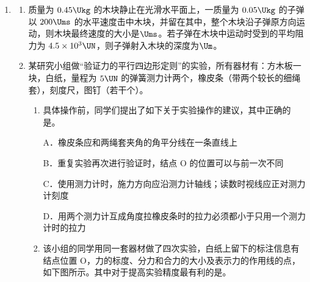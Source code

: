 \documentclass[\gkver]{gaokaozhenti}
\begin{document}
\begin{enumerate}
{若振幅为 $0.1\Um$，振子的周期可能为 $\frac{4}{5}\Us$}
{若振幅为 $0.2\Um$，振子的周期可能为 $4\Us$}
{若振幅为 $0.2\Um$，振子的周期可能为 $6\Us$}


\item
\begin{enumerate}
	\item
	质量为 $0.45\Ukg$ 的木块静止在光滑水平面上，一质量为 $0.05\Ukg$ 的子弹以 $200\Ums$ 的水平速度击中木块，并留在其中，整个木块沿子弹原方向运动，则木块最终速度的大小是$\Ums$。若子弹在木块中运动时受到的平均阻力为 $4.5 \times 10^{3}\UN$，则子弹射入木块的深度为$\Um$。
	\item
	某研究小组做“验证力的平行四边形定则”的实验，所有器材有：方木板一块，白纸，量程为 $5\UN$ 的弹簧测力计两个，橡皮条（带两个较长的细绳套），刻度尺，图钉（若干个）。

	\begin{enumerate}
		\item
		具体操作前，同学们提出了如下关于实验操作的建议，其中正确的是。

		A．橡皮条应和两绳套夹角的角平分线在一条直线上

		B．重复实验再次进行验证时，结点 O 的位置可以与前一次不同

		C．使用测力计时，施力方向应沿测力计轴线；读数时视线应正对测力计刻度

		D．用两个测力计互成角度拉橡皮条时的拉力必须都小于只用一个测力计时的拉力
		\item
		该小组的同学用同一套器材做了四次实验，白纸上留下的标注信息有结点位置 O，力的标度、分力和合力的大小及表示力的作用线的点，如下图所示。其中对于提高实验精度最有利的是。


\end{enumerate}
\end{enumerate}
\end{enumerate}
\end{document}
